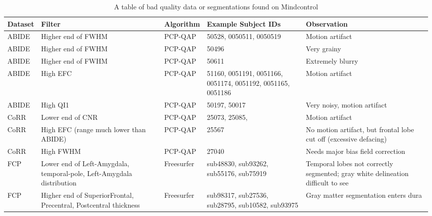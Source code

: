 \begin{table}
\begin{tabular}{ | l | p{3cm} | l | p{3cm} | p{4cm} | }

\hline
	\textbf{Dataset} & \textbf{Filter} & \textbf{Algorithm} & \textbf{Example Subject IDs} & \textbf{Observation} \\ \hline
	ABIDE & Higher end of FWHM & PCP-QAP & 50528, 0050511, 0050519 & Motion artifact \\ \hline
	ABIDE & Higher end of FWHM & PCP-QAP & 50496 & Very grainy \\ \hline
	ABIDE & Higher end of FWHM & PCP-QAP & 50611 & Extremely blurry \\ \hline
	ABIDE & High EFC & PCP-QAP & 51160, 0051191, 0051166, 0051174, 0051192, 0051165, 0051186 & Motion artifact \\ \hline
	ABIDE & High QI1 & PCP-QAP & 50197, 50017 & Very noisy, motion artifact \\ \hline
	CoRR & Lower end of CNR & PCP-QAP & 25073, 25085, & Motion artifact \\ \hline
	CoRR & High EFC (range much lower than ABIDE) & PCP-QAP & 25567 & No motion artifact, but frontal lobe cut off (excessive defacing) \\ \hline
	CoRR & High FWHM & PCP-QAP & 27040 & Needs major bias field correction \\ \hline
	FCP & Lower end of Left-Amygdala, temporal-pole, Left-Amygdala distribution & Freesurfer & sub48830, sub93262, sub55176, sub75919 & Temporal lobes not correctly segmented; gray white delineation difficult to see \\ \hline
	FCP & Higher end of SuperiorFrontal, Precentral, Postcentral thickness & Freesurfer & sub98317, sub27536, sub28795, sub10582, sub93975 & Gray matter segmentation enters dura \\ \hline



\end{tabular}
\label{tab:examples}
\caption{A table of bad quality data or segmentations found on Mindcontrol}

\end{table}
